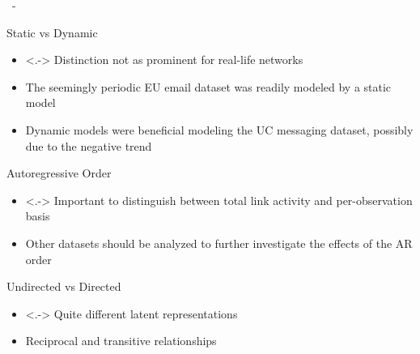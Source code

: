 \documentclass{beamer}
\newenvironment{xframe}
    {\begin{frame}{
        \ifx\insertsubsection\empty
            \strut
        \else\ifx\insertsubsubsection\empty
            \insertsection
        \else
            \insertsection~-~\insertsubsection
        \fi\fi
    }{
        \ifx\insertsubsection\empty
            \insertsection
        \else\ifx\insertsubsubsection\empty
            \insertsubsection
        \else
            \insertsubsubsection
        \fi\fi
    }}
    {\end{frame}}
\newenvironment{xblock}[1]
    {\begin{block}{#1}}
    {\end{block}}
\begin{document}
    \begin{xframe}
        \begin{xblock}{Static vs Dynamic}
            \begin{itemize}
                \item<.-> Distinction not as prominent for real-life networks
                \item The seemingly periodic EU email dataset was readily modeled by a static model
                \item Dynamic models were beneficial modeling the UC messaging dataset, possibly due to the negative trend
            \end{itemize}
        \end{xblock}
        
        \begin{xblock}{Autoregressive Order}
            \begin{itemize}
                \item<.-> Important to distinguish between total link activity and per-observation basis
                \item Other datasets should be analyzed to further investigate the effects of the AR order
            \end{itemize}
        \end{xblock}
        
        \begin{xblock}{Undirected vs Directed}
            \begin{itemize}
                \item<.-> Quite different latent representations
                \item Reciprocal and transitive relationships
            \end{itemize}
        \end{xblock}
    \end{xframe}
    
\end{document}
